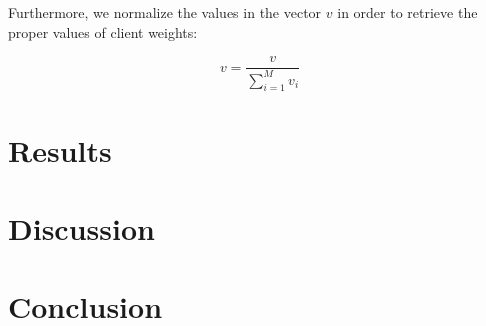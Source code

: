 \documentclass{llncs}
\begin{document}
Furthermore, we normalize the values in the vector $v$ in order to retrieve the proper values of client weights:

$$ v = \frac{v}{\sum_{i=1}^M v_i} $$


 

\section{Results}

\section{Discussion}


\section{Conclusion}






%

%
\end{document}
